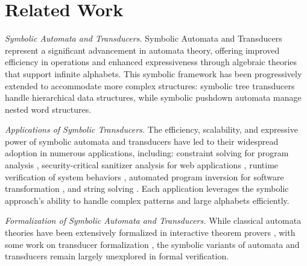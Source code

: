 \section{Related Work}
\label{sec:related-work}

\emph{Symbolic Automata and Transducers.} Symbolic Automata and Transducers \cite{cav/DAntoniV17,VeanesHLMB12Transducer, popl/DAntoniV14, entcs/DAntoniKW18, sofsem/TammV18} represent a significant advancement in automata theory, offering improved efficiency in operations and enhanced expressiveness through algebraic theories that support infinite alphabets. This symbolic framework has been progressively extended to accommodate more complex structures: symbolic tree transducers \cite{ershov/VeanesB11} handle hierarchical data structures, while symbolic pushdown automata \cite{cav/DAntoniA14} manage nested word structures. 

\emph{Applications of Symbolic Transducers.} The efficiency, scalability, and
expressive power of symbolic automata and transducers have led to their
widespread adoption in numerous applications, including: constraint solving for program analysis \cite{lpar/VeanesBM10}, security-critical sanitizer analysis for web applications \cite{uss/HooimeijerLMSV11}, runtime verification of system behaviors \cite{osdi/YaseenABCL20}, automated program inversion for software 
transformation \cite{pldi/HuD17}, and string solving
\cite{pacmpl/ChenFHHHKLRW22,CHL+19}. Each application leverages the symbolic 
approach's ability to handle complex
patterns and large alphabets efficiently.

\emph{Formalization of Symbolic Automata and Transducers.} While classical automata theories have been extensively formalized in interactive theorem provers \cite{Tuerk-NFA, Lammich2014TheCA, Peter14, cpp/DoczkalKS13}, with some work on transducer formalization \cite{afp/LochmannFSTS21}, the symbolic variants of automata and transducers remain largely unexplored in formal verification. 


